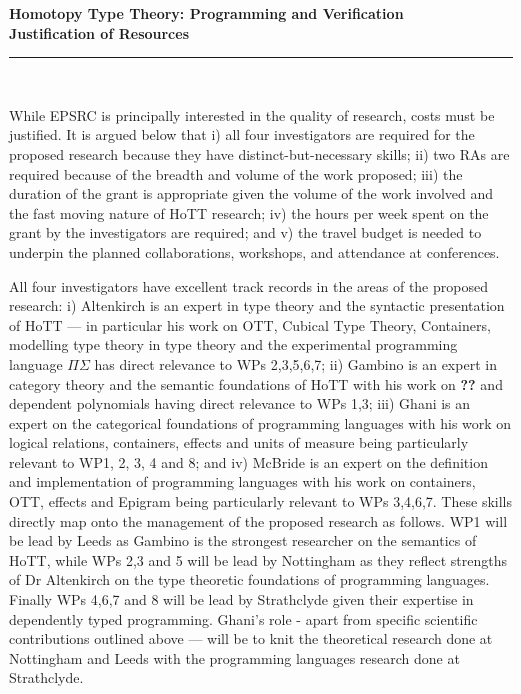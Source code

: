 \documentclass[a4paper,11pt]{article}
\begin{document}
\thispagestyle{plain}
\begin{center}
  {\Large \bf Homotopy Type Theory: Programming and Verification\\
\vspace{0.2in}
  Justification of Resources}\\[1ex]

\vspace*{-0.1in}

\rule{160mm}{.5mm}\\[2ex]
\end{center}

\noindent While EPSRC is principally interested in the quality of research,
costs must be justified. It is argued below that i) all four investigators
are required for the proposed research because they have
distinct-but-necessary skills; ii) two RAs are required because of the
breadth and volume of the work proposed; iii) the duration of the
grant is appropriate given the volume of the work involved and the
fast moving nature of HoTT research; iv) the
hours per week spent on the grant by the investigators are required;
and 
v) the travel budget is needed to underpin the planned collaborations,
workshops, and attendance at conferences.

\vspace{0.02in}

 All four investigators have
excellent track records in the areas of the proposed research: i)
Altenkirch is an expert in type theory and the syntactic presentation
of HoTT --- in particular his work on OTT, Cubical Type Theory,
Containers, modelling type theory in type theory and the experimental
programming language $\Pi\Sigma$ has direct relevance to WPs
2,3,5,6,7; ii) Gambino is an expert in category theory and the
semantic foundations of HoTT with his work on {\bf ??}  and dependent
polynomials having direct relevance to WPs 1,3; iii) Ghani is an
expert on the categorical foundations of programming languages with
his work on logical relations, containers, effects and units of
measure being particularly relevant to WP1, 2, 3, 4 and 8; and iv)
McBride is an expert on the definition and implementation of
programming languages with his work on containers, OTT, effects and
Epigram being particularly relevant to WPs 3,4,6,7. These skills
directly map onto the management of the proposed research as
follows. WP1 will be lead by Leeds as Gambino is the strongest
researcher on the semantics of HoTT, while WPs 2,3 and 5 will be lead
by Nottingham as they reflect strengths of Dr Altenkirch on the type
theoretic foundations of programming languages. Finally WPs 4,6,7 and
8 will be lead by Strathclyde given their expertise in dependently
typed programming. Ghani's role - apart from specific scientific
contributions outlined above --- will be to knit the theoretical
research done at Nottingham and Leeds with the programming languages
research done at Strathclyde.
\end{document}
